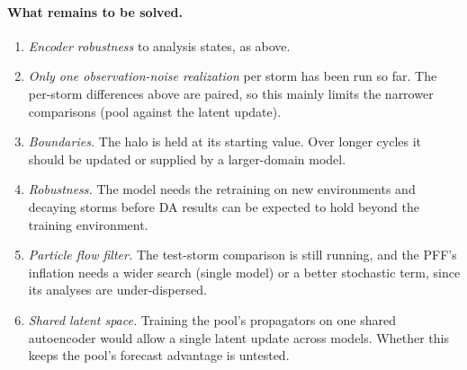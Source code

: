 \documentclass[11pt]{article}
\begin{document}
\paragraph{What remains to be solved.}
\begin{enumerate}
\item \emph{Encoder robustness} to analysis states, as above.
\item \emph{Only one observation-noise realization} per storm has been run so far. The per-storm differences above are paired, so this mainly limits the narrower comparisons (pool against the latent update).
\item \emph{Boundaries.} The halo is held at its starting value. Over longer cycles it should be updated or supplied by a larger-domain model.
\item \emph{Robustness.} The model needs the retraining on new environments and decaying storms before DA results can be expected to hold beyond the training environment.
\item \emph{Particle flow filter.} The test-storm comparison is still running, and the PFF's inflation needs a wider search (single model) or a better stochastic term, since its analyses are under-dispersed.
\item \emph{Shared latent space.} Training the pool's propagators on one shared autoencoder would allow a single latent update across models. Whether this keeps the pool's forecast advantage is untested.
\end{enumerate}
\end{document}
